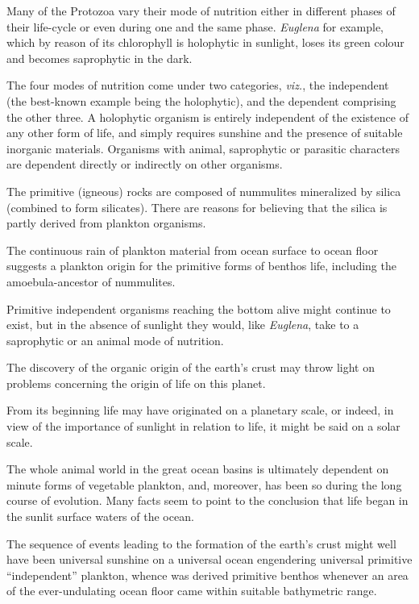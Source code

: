 \documentclass[a4paper, 12pt, oneside]{article}
\begin{document}
Many of the Protozoa vary their mode of nutrition either in different phases of their life-cycle or even during one and the same phase. \emph{Euglena} for example, which by reason of its chlorophyll is holophytic in sunlight, loses its green colour and becomes saprophytic in the dark.

The four modes of nutrition come under two categories, \emph{viz.}, the independent (the best-known example being the holophytic), and the dependent comprising the other three. A holophytic organism is entirely independent of the existence of any other form of life, and simply requires sunshine and the presence of suitable inorganic materials. Organisms with animal, saprophytic or parasitic characters are dependent directly or indirectly on other organisms.

The primitive (igneous) rocks are composed of nummulites mineralized by silica (combined to form silicates). There are reasons for believing that the silica is partly derived from plankton organisms.

The continuous rain of plankton material from ocean surface to ocean floor suggests a plankton origin for the primitive forms of benthos life, including the amoebula-ancestor of nummulites.

Primitive independent organisms reaching the bottom alive might continue to exist, but in the absence of sunlight they would, like \emph{Euglena}, take to a saprophytic or an animal mode of nutrition.

The discovery of the organic origin of the earth's crust may throw light on problems concerning the origin of life on this planet.

From its beginning life may have originated on a planetary scale, or indeed, in view of the importance of sunlight in relation to life, it might be said on a solar scale.

The whole animal world in the great ocean basins is ultimately dependent on minute forms of vegetable plankton, and, moreover, has been so during the long course of evolution. Many facts seem to point to the conclusion that life began in the sunlit surface waters of the ocean.

The sequence of events leading to the formation of the earth's crust might well have been universal sunshine on a universal ocean engendering universal primitive ``independent'' plankton, whence was derived primitive benthos whenever an area of the ever-undulating ocean floor came within suitable bathymetric range.
\end{document}
